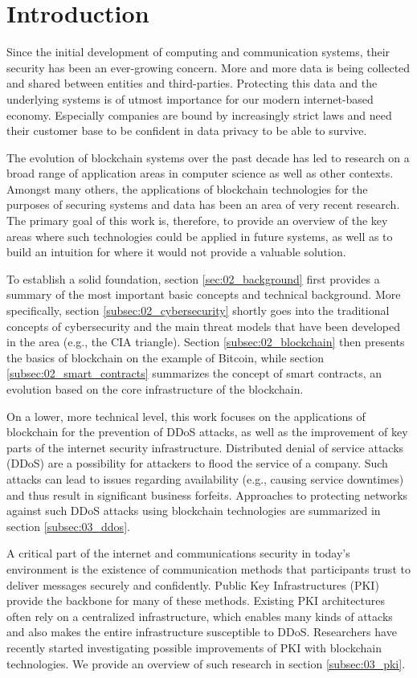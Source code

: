 \section{Introduction}

Since the initial development of computing and communication systems, their security has been an ever-growing concern. More and more data is being collected and shared between entities and third-parties. Protecting this data and the underlying systems is of utmost importance for our modern internet-based economy. Especially companies are bound by increasingly strict laws and need their customer base to be confident in data privacy to be able to survive.

The evolution of blockchain systems over the past decade has led to research on a broad range of application areas in computer science as well as other contexts. Amongst many others, the applications of blockchain technologies for the purposes of securing systems and data has been an area of very recent research. The primary goal of this work is, therefore, to provide an overview of the key areas where such technologies could be applied in future systems, as well as to build an intuition for where it would not provide a valuable solution.

To establish a solid foundation, section \ref{sec:02_background} first provides a summary of the most important basic concepts and technical background. More specifically, section \ref{subsec:02_cybersecurity} shortly goes into the traditional concepts of cybersecurity and the main threat models that have been developed in the area (e.g., the CIA triangle). Section \ref{subsec:02_blockchain} then presents the basics of blockchain on the example of Bitcoin, while section \ref{subsec:02_smart_contracts} summarizes the concept of smart contracts, an evolution based on the core infrastructure of the blockchain.

On a lower, more technical level, this work focuses on the applications of blockchain for the prevention of DDoS attacks, as well as the improvement of key parts of the internet security infrastructure. Distributed denial of service attacks (DDoS) are a possibility for attackers to flood the service of a company. Such attacks can lead to issues regarding availability (e.g., causing service downtimes) and thus result in significant business forfeits. Approaches to protecting networks against such DDoS attacks using blockchain technologies are summarized in section \ref{subsec:03_ddos}.

A critical part of the internet and communications security in today's environment is the existence of communication methods that participants trust to deliver messages securely and confidently. Public Key Infrastructures (PKI) provide the backbone for many of these methods. Existing PKI architectures often rely on a centralized infrastructure, which enables many kinds of attacks and also makes the entire infrastructure susceptible to DDoS. Researchers have recently started investigating possible improvements of PKI with blockchain technologies. We provide an overview of such research in section \ref{subsec:03_pki}.

